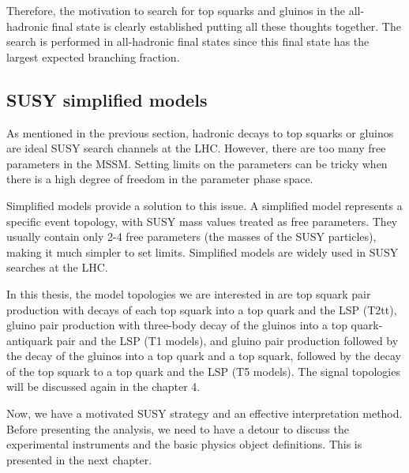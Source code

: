 Therefore, the motivation to search for top squarks and gluinos in the all-hadronic final state is clearly established putting all these thoughts together. The search is performed in all-hadronic final states since this final state has the largest expected branching fraction.

\clearpage
\subsection{SUSY simplified models}
As mentioned in the previous section, hadronic decays to top squarks or gluinos are ideal SUSY search channels at the LHC. However, there are too many free parameters in the MSSM. Setting limits on the parameters can be tricky when there is a high degree of freedom in the parameter phase space. 

Simplified models\cite{Alwall:2008ag} provide a solution to this issue. A simplified model represents a specific event topology, with SUSY mass values treated as free parameters. They usually contain only 2-4 free parameters (the masses of the SUSY particles), making it much simpler to set limits. Simplified models are widely used in SUSY searches at the LHC\cite{CMS-SMS-paper}.

In this thesis, the model topologies we are interested in are top squark pair production with decays of each top squark into a top quark and the LSP (T2tt), gluino pair production with three-body decay of the gluinos into a top quark-antiquark pair and the LSP (T1 models), and gluino pair production followed by the decay of the gluinos into a top quark and a top squark, followed by the decay of the top squark to a top quark and the LSP (T5 models). The signal topologies will be discussed again in the chapter 4.

Now, we have a motivated SUSY strategy and an effective interpretation method. Before presenting the analysis, we need to have a detour to discuss the experimental instruments and the basic physics object definitions. This is presented in the next chapter. 
